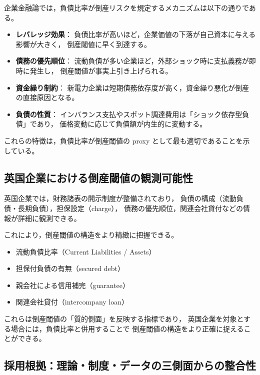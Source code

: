 企業金融論では，負債比率が倒産リスクを規定するメカニズムは以下の通りである。

\begin{itemize}
    \item \textbf{レバレッジ効果}：  
          負債比率が高いほど，企業価値の下落が自己資本に与える影響が大きく，
          倒産閾値に早く到達する。
    \item \textbf{債務の優先順位}：  
          流動負債が多い企業ほど，外部ショック時に支払義務が即時に発生し，
          倒産閾値が事実上引き上げられる。
    \item \textbf{資金繰り制約}：  
          新電力企業は短期債務依存度が高く，資金繰り悪化が倒産の直接原因となる。
    \item \textbf{負債の性質}：  
          インバランス支払やスポット調達費用は「ショック依存型負債」であり，
          価格変動に応じて負債額が内生的に変動する。
\end{itemize}

これらの特徴は，負債比率が倒産閾値の proxy として最も適切であることを示している。

\subsection{英国企業における倒産閾値の観測可能性}

英国企業では，財務諸表の開示制度が整備されており，
負債の構成（流動負債・長期負債），担保設定（charge），
債務の優先順位，関連会社貸付などの情報が詳細に観測できる。

これにより，倒産閾値の構造をより精緻に把握できる。

\begin{itemize}
    \item 流動負債比率（Current Liabilities / Assets）
    \item 担保付負債の有無（secured debt）
    \item 親会社による信用補完（guarantee）
    \item 関連会社貸付（intercompany loan）
\end{itemize}

これらは倒産閾値の「質的側面」を反映する指標であり，
英国企業を対象とする場合には，負債比率と併用することで
倒産閾値の構造をより正確に捉えることができる。

\subsection{採用根拠：理論・制度・データの三側面からの整合性}

